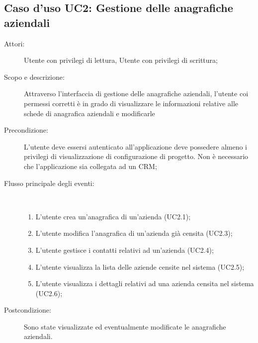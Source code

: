 \documentclass[12pt,a4paper,twoside,openright,english]{book}
\begin{document}
\subsection{Caso d'uso UC2: Gestione delle anagrafiche aziendali}\begin{description}
	\item[Attori:] Utente con privilegi di lettura, Utente con privilegi di scrittura;
	\item[Scopo e descrizione:] Attraverso l’interfaccia di gestione delle anagrafiche aziendali, l’utente coi permessi corretti è in grado di visualizzare le informazioni relative alle schede di anagrafica aziendali e modificarle
	\item[Precondizione:] L’utente deve essersi autenticato all’applicazione deve possedere almeno i privilegi di visualizzazione di configurazione di progetto. Non è necessario che l’applicazione sia collegata ad un CRM;
	
	\item[Flusso principale degli eventi:] \ 
	\begin{enumerate}
		\item L’utente crea un’anagrafica di un’azienda  (UC2.1);
		\item L’utente modifica l’anagrafica di un’azienda già censita  (UC2.3);
		\item L’utente gestisce i contatti relativi ad un’azienda  (UC2.4);
		\item L’utente visualizza la lista delle aziende censite nel sistema  (UC2.5);
		\item L’utente visualizza i dettagli relativi ad una azienda censita nel sistema  (UC2.6);
		
	\end{enumerate}
	\item[Postcondizione:] Sono state visualizzate ed eventualmente modificate le anagrafiche aziendali.
\end{description}

\hypertarget{UC2.4}{}
\end{document}
